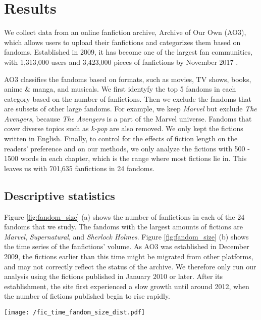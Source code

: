 \documentclass[letterpaper]{article} %
\begin{document}
\section{Results} 
We collect data from an online fanfiction archive, Archive of Our Own (AO3), which allows users to upload their fanfictions and categorizes them based on fandoms. Established in 2009, it has become one of the largest fan communities, with 1,313,000 users and 3,423,000 pieces of fanfictions by November 2017 \cite{ao3stats}.

AO3 classifies the fandoms based on formats, such as movies, TV shows, books, anime \& manga, and musicals. We first identyfy the top 5 fandoms in each category based on the number of fanfictions. Then we exclude the fandoms that are subsets of other large fandoms. For example, we keep \emph{Marvel} but exclude \emph{The Avengers}, because \emph{The Avengers} is a part of the Marvel universe. Fandoms that cover diverse topics such as \emph{k-pop} are also removed. We only kept the fictions written in English. Finally, to control for the effects of fiction length on the readers' preference and on our methods, we only analyze the fictions with 500 - 1500 words in each chapter, which is the range where most fictions lie in. This leaves us with 701,635 fanfictions in 24 fandoms. 


\subsection*{Descriptive statistics}

Figure \ref{fig:fandom_size} (a) shows the number of fanfictions in each of the 24 fandoms that we study. The fandoms with the largest amounts of fictions are \emph{Marvel}, \emph{Supernatural}, and \emph{Sherlock Holmes}. Figure \ref{fig:fandom_size} (b) shows the time series of the fanfictions' volume. As AO3 was established in December 2009, the fictions earlier than this time might be migrated from other platforms, and may not correctly reflect the status of the archive. We therefore only run our analysis using the fictions published in January 2010 or later. After its establishment, the site first experienced a slow growth until around 2012, when the number of fictions published begin to rise rapidly. 


\begin{figure*}
    \centering
    \hspace{1cm}
        \texttt{[image: /fic\_time\_fandom\_size\_dist.pdf]}
        \caption{The size of fandoms and the number of fanfictions published in time.}
        \label{fig:fandom_size}    
    \end{figure*}
\end{document}
